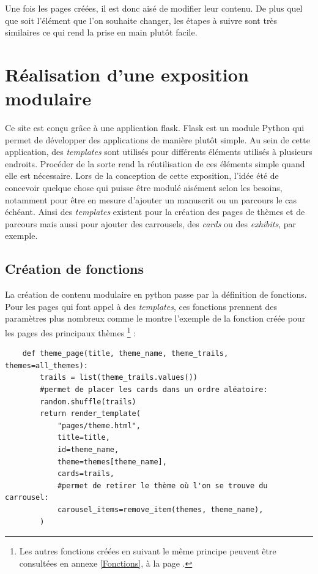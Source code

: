     Une fois les pages créées, il est donc aisé de modifier leur contenu. De plus quel que soit l'élément que l'on souhaite changer, les étapes à suivre sont très similaires ce qui rend la prise en main plutôt facile. 

	\section{Réalisation d’une exposition modulaire}
	Ce site est conçu grâce à une application flask. Flask est un module Python qui permet de développer des applications de manière plutôt simple. Au sein de cette application, des \textit{templates} sont utilisés pour différents éléments utilisés à plusieurs endroits. Procéder de la sorte rend la réutilisation de ces éléments simple quand elle est nécessaire. Lors de la conception de cette exposition, l'idée été de concevoir quelque chose qui puisse être modulé aisément selon les besoins, notamment pour être en mesure d'ajouter un manuscrit ou un parcours le cas échéant. Ainsi des \textit{templates} existent pour la création des pages de thèmes et de parcours mais aussi pour ajouter des carrousels, des \textit{cards} ou des \textit{exhibits}, par exemple. 
	
    \subsection{Création de fonctions}
    La création de contenu modulaire en python passe par la définition de fonctions. Pour les pages qui font appel à des \textit{templates}, ces fonctions prennent des paramètres plus nombreux comme le montre l'exemple de la fonction créée pour les pages des principaux thèmes \footnote{Les autres fonctions créées en suivant le même principe peuvent être consultées en annexe \ref{Fonctions}, à la page \pageref{Fonctions}.} :  
    \begin{verbatim}
    def theme_page(title, theme_name, theme_trails, themes=all_themes):
        trails = list(theme_trails.values()) 
        #permet de placer les cards dans un ordre aléatoire:
        random.shuffle(trails) 
        return render_template(
            "pages/theme.html",
            title=title,
            id=theme_name,
            theme=themes[theme_name],
            cards=trails,
            #permet de retirer le thème où l'on se trouve du carrousel:
            carousel_items=remove_item(themes, theme_name),
        )
    \end{verbatim}
    

